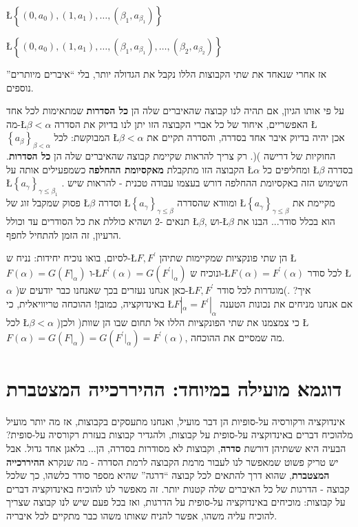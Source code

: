 \documentclass[english,hebrew]{article}
\begin{document}
\L{$\left\{ \left(0,a_{0}\right),\left(1,a_{1}\right),\ldots,\left(\beta_{1},a_{\beta_{1}}\right)\right\} $}

\L{$\left\{ \left(0,a_{0}\right),\left(1,a_{1}\right),\ldots,\left(\beta_{1},a_{\beta_{1}}\right),\ldots,\left(\beta_{2},a_{\beta_{2}}\right)\right\} $}

אז אחרי שנאחד את שתי הקבוצות הללו נקבל את הגדולה יותר, בלי \textquotedblleft איברים
מיותרים\textquotedblright{} נוספים.

על פי אותו הגיון, אם תהיה לנו קבוצה שהאיברים שלה הן \textbf{כל הסדרות}
שמתאימות לכל אחד מה-\L{$\beta<\alpha$} האפשריים, איחוד של כל אברי
הקבוצה הזו יתן לנו בדיוק את הסדרה \L{$\left\{ a_{\beta}\right\} _{\beta<\alpha}$}
המבוקשת: לכל \L{$\beta<\alpha$} אכן יהיה בדיוק איבר אחד בסדרה, והסדרה
תקיים את החוקיות של דרישה ){\endL}(. רק צריך להראות שקיימת
קבוצה שהאיברים שלה הן \textbf{כל הסדרות}. הקבוצה הזו מתקבלת \textbf{מאקסיומת
ההחלפה} כשמפעילים אותה על \L{$\alpha$} ומחליפים כל \L{$\beta$} בסדרה
\L{$\left\{ a_{\gamma}\right\} _{\gamma\le\beta_{1}}$} . השימוש הזה
באקסיומת ההחלפה דורש בעצמו עבודה טכנית - להראות שיש פסוק שמקבל זוג
של \L{$\beta$} וסדרה \L{$\left\{ a_{\gamma}\right\} _{\gamma\le\beta}$}
ומוודא שהסדרה \L{$\left\{ a_{\gamma}\right\} _{\gamma\le\beta}$}
מקיימת את תנאים {-2\endL} ושהיא כוללת את כל הסודרים עד וכולל
\L{$\beta$}, וש-\L{$\beta$} הוא בכלל סודר... הבנו את הרעיון, זה
הזמן להתחיל לחפף.

לסיום, בואו נוכיח יחידות: נניח ש-\L{$F,F^{\prime}$} הן שתי פונקציות
שמקיימות שתיהן \L{$F\left(\alpha\right)=G\left(F|_{\alpha}\right)$}
ו-\L{$F^{\prime}\left(\alpha\right)=G\left(F^{\prime}|_{\alpha}\right)$}
ונוכיח ש-\L{$F\left(\alpha\right)=F^{\prime}\left(\alpha\right)$}
לכל סודר \L{$\alpha$} )כאן אנחנו נעזרים בכך שאנחנו כבר יודעים ש-\L{$F,F^{\prime}$}
מוגדרות לכל סודר(. איך? באינדוקציה, כמובן! ההוכחה טריוויאלית, כי \L{$F|_{\alpha}=F^{\prime}|_{\alpha}$}
אם אנחנו מניחים את נכונות הטענה לכל \L{$\beta<\alpha$} )כי צמצמנו
את שתי הפונקציות הללו אל תחום שבו הן שוות( ולכן \L{$F\left(\alpha\right)=G\left(F|_{\alpha}\right)=G\left(F^{\prime}|_{\alpha}\right)=F^{\prime}\left(\alpha\right)$},
מה שמסיים את ההוכחה.

\section*{דוגמא מועילה במיוחד: ההיררכייה המצטברת}

אינדוקציה ורקורסיה על-סופיות הן דבר מועיל, ואנחנו מתעסקים בקבוצות,
אז מה יותר מועיל מלהוכיח דברים באינדוקציה על-סופית על קבוצות, ולהגדיר
קבוצות בעזרת רקורסיה על-סופית? הבעיה היא ששתיהן דורשת \textbf{סדרה},
וקבוצות לא מסודרות בסדרה, הן... בלאגן אחד גדול. אבל יש טריק פשוט שמאפשר
לנו לעבור מרמת הקבוצה לרמת הסדרה - מה שנקרא \textbf{ההיררכייה המצטברת},
שהוא דרך להתאים לכל קבוצה \textquotedblleft דרגה\textquotedblright{}
שהיא מספר סודר כלשהו, כך שלכל קבוצה - הדרגות של כל האיברים שלה קטנות
יותר. זה מאפשר לנו להוכיח באינדוקציה דברים על קבוצות: מוכיחים באינדוקציה
על-סופית על הדרגות, ואז בכל פעם שיש לנו קבוצה שצריך להוכיח עליה משהו,
אפשר להניח שאותו משהו כבר מתקיים לכל איבריה.
\end{document}
